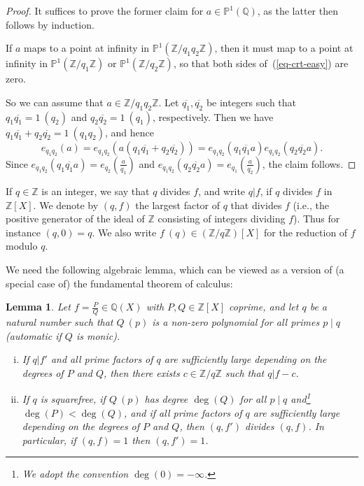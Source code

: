 \documentclass[12pt,a4paper,reqno]{amsart}
\numberwithin{equation}{section}
\theoremstyle{plain}
\newtheorem{lemma}[theorem]{Lemma}
\theoremstyle{definition}
\newcommand\Z{\mathbb{Z}}
\newcommand\Q{\mathbb{Q}}
\renewcommand\P{\mathbb{P}}
\begin{document}
\begin{proof} It suffices to prove the former claim for
  $a\in\P^1(\Q)$, as the latter then follows by induction. 

If $a$ maps to a point at infinity in $\P^1(\Z/q_1q_2\Z)$, then it
must map to a point at infinity in $\P^1(\Z/q_1\Z)$ or
$\P^1(\Z/q_2\Z)$, so that both sides of~(\ref{eq-crt-easy}) are zero.

So we can assume that $a\in \Z/q_1q_2\Z$. Let $\overline{q_1},
\overline{q_2}$ be integers such that $q_1 \overline{q_1} = 1\ (q_2)$
and $q_2 \overline{q_2} = 1\ (q_1)$, respectively. Then we have $q_1
\overline{q_1} + q_2 \overline{q_2} = 1\ (q_1 q_2)$, and hence
$$ 
e_{q_1 q_2}(a) = e_{q_1q_2}(a(q_1\overline{q_1}+q_2\overline{q_2}))=
e_{q_1 q_2}( q_1 \overline{q_1} a ) e_{q_1 q_2}( q_2 \overline{q_2} a
).
$$ 
Since $e_{q_1 q_2}( q_1 \overline{q_1} a ) = e_{q_2}(\frac{a}{q_1})$
and $e_{q_1 q_2}( q_2 \overline{q_2} a ) = e_{q_1}(\frac{a}{q_2})$,
the claim follows.
\end{proof}



If $q\in\Z$ is an integer, we say that $q$ divides $f$, and write
$q|f$, if $q$ divides $f$ in $\Z[X]$.  We denote by $(q,f)$ the
largest factor of $q$ that divides $f$ (i.e., the positive generator
of the ideal of $\Z$ consisting of integers dividing $f$).  Thus for instance $(q,0)=q$. We also write $f\ (q) \in (\Z/q\Z)[X]$ for the reduction of $f$ modulo $q$.

We need the following algebraic lemma, which can be viewed as a
version of (a special case of) the fundamental theorem of calculus:

\begin{lemma}\label{fund} Let $f =
  \frac{P}{Q}\in \Q(X)$ with $P,Q \in \Z[X]$ coprime, and
  let $q$ be a natural number such that $Q\ (p)$ is a non-zero
  polynomial for all primes $p\mid q$ (automatic if $Q$ is monic).
\par
\begin{enumerate}[(i)]
\item  If $q|f'$ and all prime factors of $q$ are sufficiently
  large depending on the degrees of $P$ and $Q$, then there exists $c
  \in \Z/q\Z$ such that $q|f-c$. 
\item  If $q$ is squarefree, if $Q\ (p)$ has degree $\deg(Q)$ for
all $p\mid q$ and\footnote{We adopt the convention $\deg(0)=-\infty$.} $\deg(P)<\deg(Q)$, and if all prime factors of $q$
are sufficiently large depending on the degrees of $P$ and $Q$, then
$(q,f')$ divides $(q,f)$. In particular, if $(q,f)=1$ then $(q,f')=1$.
\end{enumerate}
\end{lemma}
\end{document}
